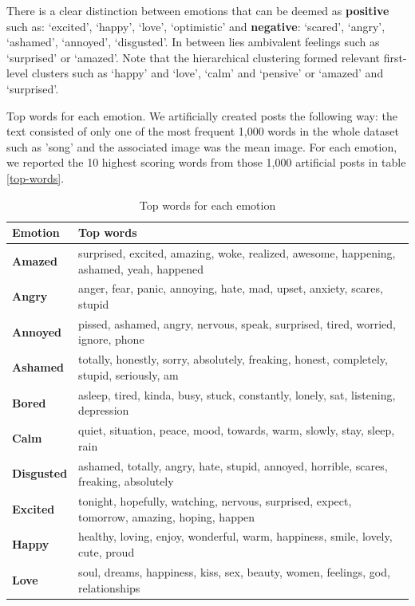 \documentclass{article} %
\begin{document}
There is a clear distinction between emotions that can be deemed as \textbf{positive} such as: `excited', `happy', `love', `optimistic' and \textbf{negative}: `scared', `angry', `ashamed', `annoyed', `disgusted'. In between lies ambivalent feelings such as `surprised' or `amazed'. Note that the hierarchical clustering formed relevant first-level clusters such as `happy' and `love', `calm' and `pensive' or `amazed' and `surprised'.

Top words for each emotion. We artificially created posts the following way: the text consisted of only one of the most frequent 1,000 words in the whole dataset such as 'song'  and the associated image was the mean image. For each emotion, we reported the 10 highest scoring words from those 1,000 artificial posts in table \ref{top-words}.

\begin{table}[H]
\caption{Top words for each emotion}
\begin{center}
    \begin{tabular}{ l | l}
    Emotion & Top words\\
    \hline
    \textbf{Amazed} & surprised, excited, amazing, woke, realized, awesome, happening, ashamed, yeah, happened\\
    \textbf{Angry} & anger, fear, panic, annoying, hate, mad, upset, anxiety, scares, stupid\\
    \textbf{Annoyed} & pissed, ashamed, angry, nervous, speak, surprised, tired, worried, ignore, phone\\
    \textbf{Ashamed} & totally, honestly, sorry, absolutely, freaking, honest, completely, stupid, seriously, am\\
    \textbf{Bored} & asleep, tired, kinda, busy, stuck, constantly, lonely, sat, listening, depression\\
    \textbf{Calm} & quiet, situation, peace, mood, towards, warm, slowly, stay, sleep, rain\\
    \textbf{Disgusted} & ashamed, totally, angry, hate, stupid, annoyed, horrible, scares, freaking, absolutely\\
    \textbf{Excited} & tonight, hopefully, watching, nervous, surprised, expect, tomorrow, amazing, hoping, happen\\
    \textbf{Happy} & healthy, loving, enjoy, wonderful, warm, happiness, smile, lovely, cute, proud\\
    \textbf{Love} & soul, dreams, happiness, kiss, sex, beauty, women, feelings, god, relationships \\

\end{tabular}
\end{center}
\end{table}
\end{document}

